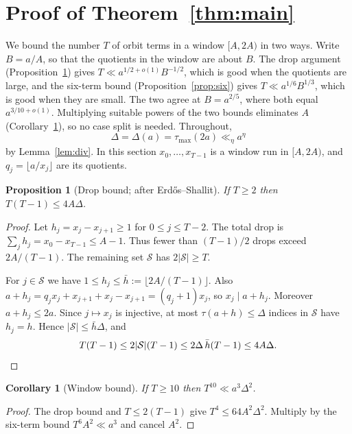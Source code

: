 \documentclass[11pt]{article}
\newtheorem{proposition}[theorem]{Proposition}
\newtheorem{corollary}[theorem]{Corollary}
\theoremstyle{definition}
\theoremstyle{remark}
\begin{document}
\section{Proof of Theorem~\ref{thm:main}}\label{sec:proof310}

We bound the number $T$ of orbit terms in a window $[A,2A)$ in two ways.
Write $B=a/A$, so that the quotients in the window are about $B$. The drop
argument (Proposition~\ref{prop:drop}) gives $T\ll a^{1/2+o(1)}B^{-1/2}$,
which is good when the quotients are large, and the six-term bound
(Proposition~\ref{prop:six}) gives $T\ll a^{1/6}B^{1/3}$, which is good when
they are small. The two agree at $B=a^{2/5}$, where both equal
$a^{3/10+o(1)}$. Multiplying suitable powers of the two bounds eliminates $A$
(Corollary~\ref{cor:window}), so no case split is needed. Throughout,
\[
 \Delta=\Delta(a)=\tau_{\max}(2a)\ll_\eta a^\eta
\]
by Lemma~\ref{lem:div}. In this section $x_0,\dots,x_{T-1}$ is a window run in
$[A,2A)$, and $q_j=\lfloor a/x_j\rfloor$ are its quotients.

\begin{proposition}[Drop bound; after Erd\H{o}s--Shallit]\label{prop:drop}
If $T\ge2$ then $T(T-1)\le 4A\Delta$.
\end{proposition}

\begin{proof}
Let $h_j=x_j-x_{j+1}\ge1$ for $0\le j\le T-2$. The total drop is
$\sum_jh_j=x_0-x_{T-1}\le A-1$. Thus fewer than $(T-1)/2$ drops exceed
$2A/(T-1)$. The remaining set $\mathcal S$ has $2|\mathcal S|\ge T$.

For $j\in\mathcal S$ we have $1\le h_j\le\bar h:=\lfloor 2A/(T-1)\rfloor$. Also
$a+h_j=q_jx_j+x_{j+1}+x_j-x_{j+1}=(q_j+1)x_j$, so $x_j\mid a+h_j$. Moreover
$a+h_j\le 2a$. Since $j\mapsto x_j$ is injective, at most $\tau(a+h)\le\Delta$ indices
in $\mathcal S$ have $h_j=h$. Hence $|\mathcal S|\le\bar h\Delta$, and
\[
T(T-1)\le 2|\mathcal S|(T-1)\le 2\Delta\,\bar h(T-1)\le 4A\Delta. \qedhere
\]
\end{proof}

\begin{corollary}[Window bound]\label{cor:window}
If $T\ge10$ then $T^{10}\ll a^3\Delta^2$.
\end{corollary}

\begin{proof}
The drop bound and $T\le2(T-1)$ give $T^4\le64A^2\Delta^2$.
Multiply by the six-term bound $T^6A^2\ll a^3$ and cancel $A^2$.
\end{proof}
\end{document}

